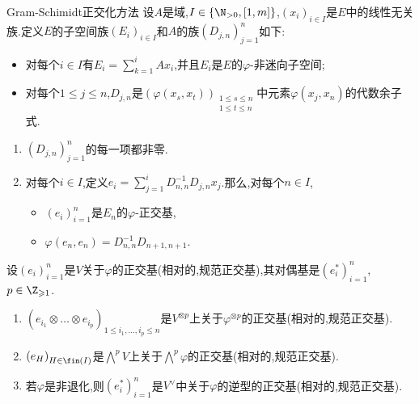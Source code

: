 \begin{proposition}{Gram-Schimidt正交化方法}{}
	设$A$是域,$I\in\left\{\N_{>0},\left[1,m\right]\right\}$,$\left(x_{i}\right)_{i\in I}$是$E$中的线性无关族.定义$E$的子空间族$\left(E_{i}\right)_{i\in I}$和$A$的族$\left(D_{j,n}\right)_{j=1}^{n}$如下:
	\begin{itemize}
		\item 对每个$i\in I$有$E_{i}=\sum\limits_{k=1}^{i}Ax_{i}$,并且$E_{i}$是$E$的$\varphi$-非迷向子空间;
		\item 对每个$1\leq j\leq n$,$D_{j,n}$是$\left(\varphi\left(x_{s},x_{t}\right)\right)_{\substack{1\leq s\leq n\\ 1\leq t\leq n}}$中元素$\varphi\left(x_{j},x_{n}\right)$的代数余子式.
	\end{itemize}
	\begin{enumerate}
		\item $\left(D_{j,n}\right)_{j=1}^{n}$的每一项都非零.
		\item 对每个$i\in I$,定义$e_{i}=\sum\limits_{j=1}^{i}D_{n,n}^{-1}D_{j,n}x_{j}$.那么,对每个$n\in I$,
		\begin{itemize}
			\item $\left(e_{i}\right)_{i=1}^{n}$是$E_{n}$的$\varphi$-正交基,
			\item $\varphi\left(e_{n},e_{n}\right)=D_{n,n}^{-1}D_{n+1,n+1}$.
		\end{itemize}
	\end{enumerate}
\end{proposition}

\begin{proposition}{}{}
	设$\left(e_{i}\right)_{i=1}^{n}$是$V$关于$\varphi$的正交基(相对的,规范正交基),其对偶基是$\left(e_{i}^{\ast}\right)_{i=1}^{n}$,$p\in\Z_{\geqslant 1}$.
	\begin{enumerate}
		\item $\left(e_{i_{1}}\otimes\ldots\otimes e_{i_{p}}\right)_{1\leqslant i_{1},\ldots,i_{p}\leqslant n}$是$V^{\otimes p}$上关于$\varphi^{\otimes p}$的正交基(相对的,规范正交基).
		\item $\left(e_{H}\right)_{H\in\fin\left(I\right)}$是$\bigwedge^{p}V$上关于$\bigwedge\limits^{p}\varphi$的正交基(相对的,规范正交基).
		\item 若$\varphi$是非退化,则$\left(e_{i}^{\ast}\right)_{i=1}^{n}$是$V^{\vee}$中关于$\varphi$的逆型的正交基(相对的,规范正交基).
	\end{enumerate}
\end{proposition}